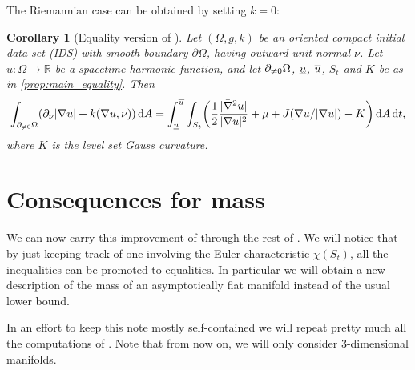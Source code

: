 \documentclass[draft]{amsart}
\newtheorem{corollary}[theorem]{Corollary}
\DeclarePairedDelimiter{\parens}{(}{)}
\let\p\parens %
\newcommand*{\maps}{\colon}
\newcommand*{\reals}{\mathbb{R}}
\newcommand*{\boundary}{\partial}
\DeclarePairedDelimiter{\abs}{\lvert}{\rvert} %
\newcommand*{\nolink}[1]{%
  {\protect\NoHyper#1\protect\endNoHyper}%
}
\begin{document}
The Riemannian case can be obtained by setting \( k=0 \):
\begin{corollary}[Equality version of \texorpdfstring{}{\nolink}{\cite[Proposition 3.2]{brayHarmonicFunctionsMass2019}}]
    Let \( (\Omega,g,k) \) be an oriented compact initial data set (IDS) with smooth boundary \( \boundary{\Omega} \), having outward unit normal \( \nu \). Let \( u\maps \Omega\to \reals \) be a spacetime harmonic function, and let \( \partial_{\neq 0}\Omega \), \( \underline{u} \), \( \overline{u} \), \( S_t \) and \( K \) be as in \cref{prop:main_equality}. Then
    \begin{equation*}
        \int_{\nonzeroboundary} (\partial_\nu \abs{\nabla u}+k(\nabla u,\nu))\odif{A}=\int_{\minu}^{\maxu}\int_{S_t} \p*{\frac{1}{2}\frac{\abs{\spacetimehessian u}}{\abs{\nabla u}^2}+\mu+J(\nabla u/\abs{\nabla u})-K}\odif A\odif{t},
    \end{equation*}
    where \( K \) is the level set Gauss curvature.
\end{corollary}
\section{Consequences for mass}
We can now carry this improvement of \cite[Propositon 3.2]{brayHarmonicFunctionsMass2019} through the rest of \cite{brayHarmonicFunctionsMass2019}. We will notice that by just keeping track of one  involving the Euler characteristic \( \chi(S_t) \), all the inequalities can be promoted to equalities. In particular we will obtain a new description of the mass of an asymptotically flat manifold instead of the usual lower bound.

In an effort to keep this note mostly self-contained we will repeat pretty much all the computations of \cite{brayHarmonicFunctionsMass2019}. Note that from now on, we will only consider \( 3 \)-dimensional manifolds.
\end{document}
